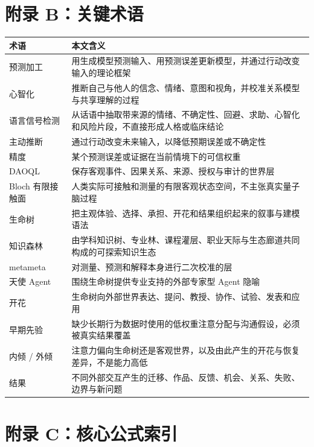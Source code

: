 \documentclass[UTF8,a4paper,11pt]{ctexart}
\begin{document}
\section{附录 B：关键术语}

\begin{center}
\begin{longtable}{@{}p{3.4cm}p{9.6cm}@{}}
\toprule
\textbf{术语} & \textbf{本文含义} \\
\midrule
预测加工 & 用生成模型预测输入、用预测误差更新模型，并通过行动改变输入的理论框架 \\
心智化 & 推断自己与他人的信念、情绪、意图和视角，并校准关系模型与共享理解的过程 \\
语言信号检测 & 从话语中抽取带来源的情绪、不确定性、回避、求助、心智化和风险片段，不直接形成人格或临床结论 \\
主动推断 & 通过行动改变未来输入，以降低预期误差或不确定性 \\
精度 & 某个预测误差或证据在当前情境下的可信权重 \\
DAOQL & 保存客观事件、因果关系、来源、授权与审计的世界层 \\
Bloch 有限接触面 & 人类实际可接触和测量的有限客观状态空间，不主张真实量子脑过程 \\
生命树 & 把主观体验、选择、承担、开花和结果组织起来的叙事与建模语法 \\
知识森林 & 由学科知识树、专业林、课程灌层、职业天际与生态廊道共同构成的可探索知识生态 \\
metameta & 对测量、预测和解释本身进行二次校准的层 \\
天使 Agent & 围绕生命树提供专业支持的外部专家型 Agent 隐喻 \\
开花 & 生命树向外部世界表达、提问、教授、协作、试验、发表和应用 \\
早期先验 & 缺少长期行为数据时使用的低权重注意分配与沟通假设，必须被真实结果覆盖 \\
内倾 / 外倾 & 注意力偏向生命树还是客观世界，以及由此产生的开花与恢复差异，不是能力高低 \\
结果 & 不同外部交互产生的迁移、作品、反馈、机会、关系、失败、边界与新问题 \\
\bottomrule
\end{longtable}
\end{center}

\section{附录 C：核心公式索引}
\end{document}
